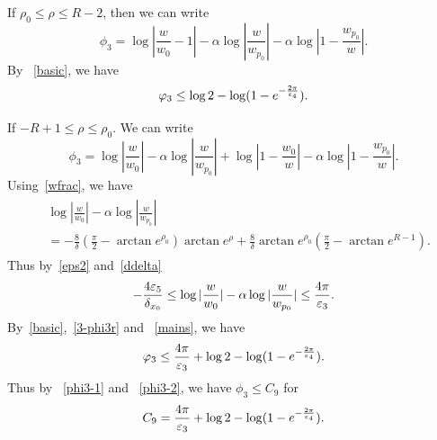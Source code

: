 If $\rho_0\leq\rho\leq R-2$, then we can write
\[
\phi_3=\log|\frac{w}{w_0}-1|-\alpha\log|\frac{w}{w_{p_0}}|
-\alpha\log|1-\frac{w_{p_0}}{w}|.
\]
By ~\eqref{basic}, we have
\begin{equation}\label{phi3-1}
\varphi_3\leq\log 2-\log (1-e^{-\frac{2\pi}{\varepsilon_4}}).
\end{equation}

If $-R+1\leq\rho\leq\rho_0$. We can write
\begin{equation}\label{3-phi3r}
\phi_3=\log|\frac{w}{w_0}|-\alpha\log|\frac{w}{w_{p_0}}|
+\log|1-\frac{w_0}{w}|-\alpha\log|1-\frac{w_{p_0}}{w}|.
\end{equation}
Using~\eqref{wfrac},
we have
\begin{align}\label{mainp}
\begin{split}
&\log|\frac{w}{w_0}|-\alpha\log|\frac{w}{w_{p_0}}|\\
&=-\frac 8\delta (\frac\pi 2-\arctan e^{\rho_0})
\arctan e^\rho
+\frac{8}{\delta}\arctan e^{\rho_0}
(\frac\pi 2-\arctan e^{R-1}).
\end{split}
\end{align}
Thus by~\eqref{eps2} and~\eqref{ddelta}
\begin{equation}\label{mains}
-\frac{4\varepsilon_5}{\delta_{x_0}}\leq
\log|\frac{w}{w_0}|-\alpha\log|\frac{w}{w_{p_0}}|
\leq\frac{4\pi}{\varepsilon_3}.
\end{equation}
By~\eqref{basic},~\eqref{3-phi3r} and ~\eqref{mains}, we have
\begin{equation}\label{phi3-2}
\varphi_3\leq\frac{4\pi}{\varepsilon_3}+\log 2-\log (1-e^{-\frac{2\pi}{\varepsilon_4}}).
\end{equation}
Thus by ~\eqref{phi3-1} and ~\eqref{phi3-2}, we have $\phi_3\leq C_9$ for
\[
C_9=\frac{4\pi}{\varepsilon_3}+\log 2-\log (1-e^{-\frac{2\pi}{\varepsilon_4}}).
\]


